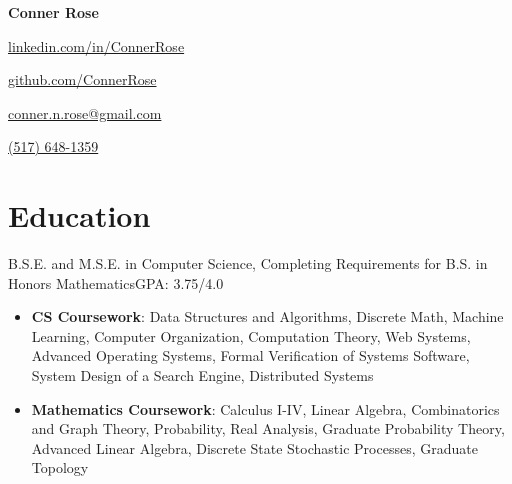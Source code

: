 \documentclass[letterpaper,11pt]{article}
\begin{document}
\begin{center}
  \huge{\textbf{Conner Rose}} \\
  \begin{itemize*}
    \item[] \href{https://linkedin.com/in/ConnerRose}{linkedin.com/in/ConnerRose}
    \item \href{https://github.com/ConnerRose}{github.com/ConnerRose}
    \item \href{mailto:conner.n.rose@gmail.com}{conner.n.rose@gmail.com}
    \item \href{tel:+15176481359}{(517) 648-1359}
  \end{itemize*}
\end{center}

\section{Education}
{B.S.E. and M.S.E. in Computer Science, Completing Requirements for B.S. in
  Honors Mathematics}{GPA: 3.75/4.0}
\begin{itemize}
  \item \textbf{CS Coursework}: Data Structures and Algorithms, Discrete Math,
        Machine Learning, Computer Organization, Computation Theory,
        Web Systems, Advanced Operating Systems, Formal Verification of Systems
        Software, \\
        System Design of a Search Engine, Distributed Systems
  \item \textbf{Mathematics Coursework}: Calculus I-IV, Linear Algebra,
        Combinatorics and Graph Theory, Probability, Real Analysis, Graduate
        Probability Theory, Advanced Linear Algebra, Discrete State Stochastic
        Processes, Graduate Topology
\end{itemize}
\end{document}

